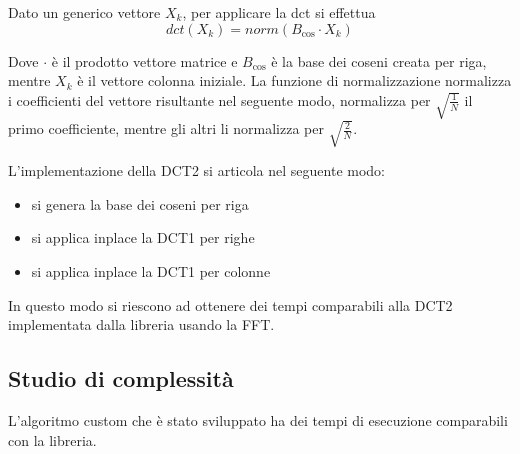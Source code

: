 Dato un generico vettore $X_k$, per applicare la dct si effettua 
\begin{equation*}
    dct(X_k) = norm(B_{\cos}\cdot X_k )
\end{equation*}

Dove $\cdot$ è il prodotto vettore matrice e $B_{\cos}$ è la base dei coseni creata 
per riga, mentre $X_k$ è il vettore colonna iniziale. La funzione di normalizzazione 
normalizza i coefficienti del vettore risultante nel seguente modo, normalizza 
per $\sqrt{\frac{1}{N}}$ il primo coefficiente, mentre gli altri li normalizza 
per $\sqrt{\frac{2}{N}}$.

L'implementazione della DCT2 si articola nel seguente modo:
\begin{itemize}
    \item si genera la base dei coseni per riga
    \item si applica inplace la DCT1 per righe
    \item si applica inplace la DCT1 per colonne
\end{itemize}

In questo modo si riescono ad ottenere dei tempi comparabili alla DCT2 implementata 
dalla libreria usando la FFT.

\subsection{Studio di complessità}
L'algoritmo custom che è stato sviluppato ha dei tempi di esecuzione comparabili 
con la libreria. 


